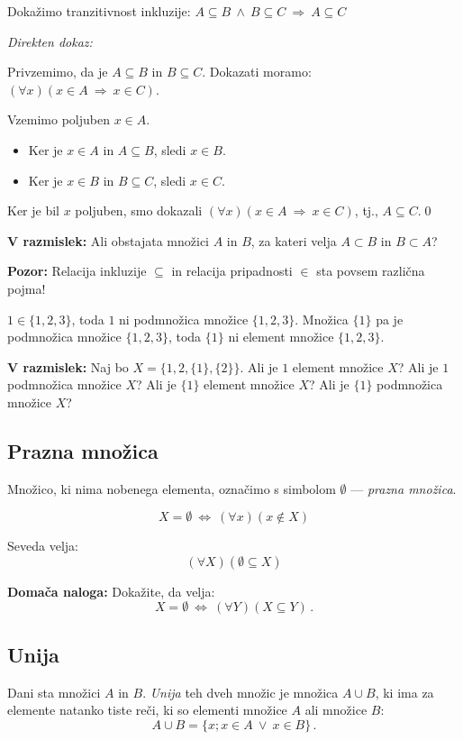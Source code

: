 \documentclass[11pt,paper=b5,footinclude,headinclude]{scrbook} %
\def\ali {{~\vee~}}
\def\inn {{~\wedge~}}
\def\sledi {{~\Rightarrow~}}
\def\cee {{~\Leftrightarrow~}}
\begin{document}
Dokažimo tranzitivnost inkluzije: $A\subseteq B \inn B\subseteq C \sledi A \subseteq C$

{\em Direkten dokaz:}

Privzemimo, da je $A\subseteq B$ in $B\subseteq C$.
Dokazati moramo: $(\forall x)(x\in A\sledi x\in C)$.

Vzemimo poljuben $x\in A$.
\begin{itemize}
  \item Ker je $x\in A$ in $A\subseteq B$, sledi $x\in B$.
  \item Ker je $x\in B$ in $B\subseteq C$, sledi $x\in C$.
\end{itemize}
Ker je bil $x$ poljuben, smo dokazali $(\forall x)(x\in A\sledi x\in C)$, tj., $A\subseteq C$.\qed


\medskip
\noindent\textbf{ V razmislek:} Ali obstajata množici $A$ in $B$, za kateri velja $A\subset B$ in $B\subset A$?

\bigskip
\noindent\textbf{ Pozor:} Relacija inkluzije $\subseteq$ in relacija pripadnosti $\in$ sta povsem različna pojma!

$1\in\{1,2,3\}$, toda $1$ ni podmnožica množice $\{1,2,3\}$.
Množica $\{1\}$ pa je podmnožica množice $\{1,2,3\}$, toda
$\{1\}$ ni element množice $\{1,2,3\}$.

\bigskip
\noindent\textbf{ V razmislek:} Naj bo $X = \{1,2,\{1\},\{2\}\}$.
Ali je $1$ element množice $X$?
Ali je $1$ podmnožica množice $X$?
Ali je $\{1\}$ element množice $X$?
Ali je $\{1\}$ podmnožica množice $X$?

\bigskip
\subsection{Prazna množica}
Množico, ki nima nobenega elementa, označimo s simbolom $\emptyset$ --- {\em prazna množica}.

$$X = \emptyset \cee (\forall x)(x\not\in X)$$

Seveda velja:
$$(\forall X) (\emptyset \subseteq X)$$

\textbf{ Domača naloga:} Dokažite, da velja:
$$X = \emptyset\cee (\forall Y)(X\subseteq Y)\,.$$

\subsection{Unija}

Dani sta množici $A$ in $B$. {\em Unija} teh dveh množic je množica $A\cup B$, ki ima za elemente natanko tiste reči, ki so elementi množice $A$ ali množice $B$:
$$A\cup B = \{x; x\in A \ali x\in B\}\,.$$
\end{document}

